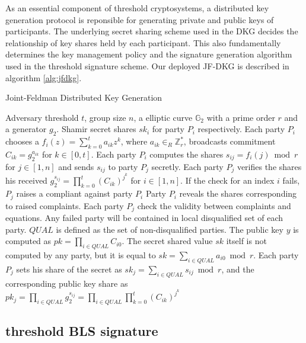 \documentclass[11pt]{article}
\begin{document}
As an essential component of threshold cryptosystems, a distributed key generation protocol is reponsible for generating private and public keys of participants. The underlying secret sharing scheme used in the DKG decides the relationship of key shares held by each participant. This also fundamentally determines the key management policy and the signature generation algorithm used in the threshold signature scheme. Our deployed JF-DKG is described in algorithm \ref{alg:jfdkg}.

\begin{algorithm}
\caption{Joint-Feldman Distributed Key Generation \cite{gennaro2007secure}}\label{alg:jfdkg}
\begin{algorithmic}[1]
\Require Adversary threshold $t$, group size $n$, a elliptic curve $\mathbb{G}_2$ with a prime order $r$ and a generator $g_2$.
\Ensure Shamir secret shares $sk_i$ for party $P_i$ respectively.
\State Each party $P_i$ chooses a $f_i(z) = \sum_{k=0}^t a_{ik}z^{k}$, where $a_{ik} \in_R \mathbb{Z}_r^*$, broadcasts commitment $C_{ik} = g_2^{a_{ik}}$ for $k \in [0,t]$. Each party $P_i$ computes the shares $s_{ij} = f_i(j) \bmod r$ for $j \in [1,n]$ and sends $s_{ij}$ to party $P_j$ secretly.
\State Each party $P_j$ verifies the shares his received $g_2^{s_{ij}} = \prod_{k=0}^t(C_{ik})^{j^k}$ for $i \in [1,n]$. If the check for an index $i$ fails, $P_j$ raises a compliant against party $P_i$
\State Party $P_i$ reveals the shares corresponding to raised complaints. Each party $P_j$ check the validity between complaints and equations. Any failed party will be contained in local disqualified set of each party. $QUAL$ is defined as the set of non-disqualified parties.
\State The public key $y$ is computed as $pk = \prod_{i\in QUAL} C_{i0}$. The secret shared value $sk$ itself is not computed by any party, but it is equal to $sk = \sum_{i \in QUAL} a_{i0} \bmod r$. Each party $P_j$ sets his share of the secret as $sk_j = \sum_{i\in QUAL} s_{ij} \bmod r$, and the corresponding public key share as $pk_j = \prod_{i \in QUAL} g_2^{s_{ij}} = \prod_{i \in QUAL} \prod_{k=0}^t (C_{ik})^{j^k}$
\end{algorithmic}
\end{algorithm}

\subsection{threshold BLS signature}
\end{document}
